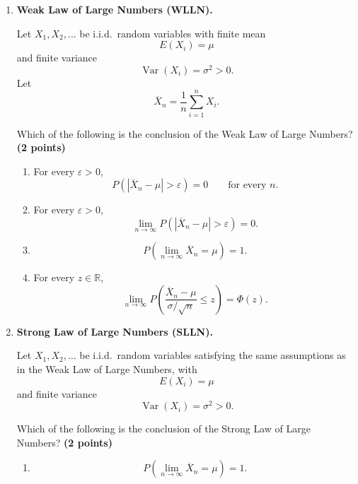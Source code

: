 \documentclass[11pt]{article}
\begin{document}
\begin{enumerate}[label=(\alph*),leftmargin=*,itemsep=1.2em]

\item \textbf{Weak Law of Large Numbers (WLLN).}

Let \(X_1,X_2,\ldots\) be i.i.d.\ random variables with finite mean
\[
E(X_i)=\mu
\]
and finite variance
\[
\operatorname{Var}(X_i)=\sigma^2>0.
\]
Let
\[
\overline X_n=\frac1n\sum_{i=1}^n X_i.
\]

Which of the following is the conclusion of the Weak Law of Large Numbers?
\hfill \textbf{(2 points)}

\begin{enumerate}[label=(\Alph*),leftmargin=2em,itemsep=0.5em]

    \item For every \(\varepsilon>0\),
    \[
    P\left(
    |\overline X_n-\mu|>\varepsilon
    \right)=0
    \qquad
    \text{for every }n.
    \]

    \item For every \(\varepsilon>0\),
    \[
    \lim_{n\to\infty}
    P\left(
    |\overline X_n-\mu|>\varepsilon
    \right)
    =0.
    \]

    \item
    \[
    P\left(
    \lim_{n\to\infty}\overline X_n=\mu
    \right)=1.
    \]

    \item For every \(z\in\mathbb R\),
    \[
    \lim_{n\to\infty}
    P\left(
    \frac{\overline X_n-\mu}{\sigma/\sqrt n}
    \leq z
    \right)
    =
    \Phi(z).
    \]

\end{enumerate}


\item \textbf{Strong Law of Large Numbers (SLLN).}

Let \(X_1,X_2,\ldots\) be i.i.d.\ random variables satisfying the same
assumptions as in the Weak Law of Large Numbers, with
\[
E(X_i)=\mu
\]
and finite variance
\[
\operatorname{Var}(X_i)=\sigma^2>0.
\]

Which of the following is the conclusion of the Strong Law of Large Numbers?
\hfill \textbf{(2 points)}

\begin{enumerate}[label=(\Alph*),leftmargin=2em,itemsep=0.5em]

    \item
    \[
    P\left(
    \lim_{n\to\infty}\overline X_n=\mu
    \right)=1.
    \]


\end{enumerate}
\end{enumerate}
\end{document}
